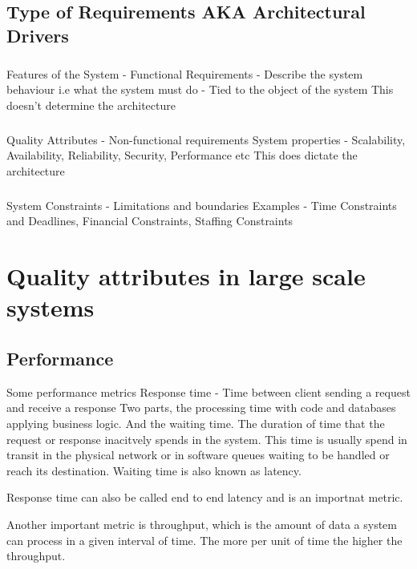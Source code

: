 \documentclass[a4paper, 11pt]{book}
\begin{document}
    \section{Type of Requirements AKA Architectural Drivers}

    \paragraph{}
    Features of the System - Functional Requirements - Describe the system behaviour i.e what the system must do - Tied to the object of the system
    This doesn't determine the architecture

    \paragraph{}
    Quality Attributes - Non-functional requirements
    System properties - Scalability, Availability, Reliability, Security, Performance etc
    This does dictate the architecture

    \paragraph{}
    System Constraints - Limitations and boundaries
    Examples - Time Constraints and Deadlines, Financial Constraints, Staffing Constraints

    \chapter{Quality attributes in large scale systems}

    \section{Performance}
    Some performance metrics
    Response time - Time between client sending a request and receive a response
    Two parts, the processing time with code and databases applying business logic.
    And the waiting time.
    The duration of time that the request or response inacitvely spends in the system.
    This time is usually spend in transit in the physical network or in software queues waiting to be handled or reach its destination.
    Waiting time is also known as latency.

    Response time can also be called end to end latency and is an importnat metric.

    Another important metric is throughput, which is the amount of data a system can process in a given interval of time.
    The more per unit of time the higher the throughput.
\end{document}
